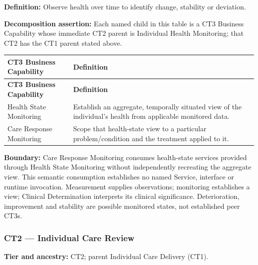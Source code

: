 \label{rad:business:336}

\textbf{Definition:} Observe health over time to identify change, stability or deviation.

\label{rad:business:338}

\textbf{Decomposition assertion:} Each named child in this table is a CT3 Business Capability whose immediate CT2 parent is Individual Health Monitoring; that CT2 has the CT1 parent stated above.

\label{rad:business:340}
\begingroup\small\setlength{\TableWidth}{\dimexpr\linewidth-4\tabcolsep-3\arrayrulewidth\relax}
\begin{longtable}{|>{\raggedright\arraybackslash}p{0.35\TableWidth}|>{\raggedright\arraybackslash}p{0.65\TableWidth}|}
\hline\rowcolor{TableHead}\textbf{CT3 Business Capability} & \textbf{Definition}\\\hline\endfirsthead
\hline\rowcolor{TableHead}\textbf{CT3 Business Capability} & \textbf{Definition}\\\hline\endhead
\hline\endfoot
Health State Monitoring & Establish an aggregate, temporally situated view of the individual’s health from applicable monitored data.\\\hline
Care Response Monitoring & Scope that health-state view to a particular problem/\allowbreak{}condition and the treatment applied to it.\\\hline
\end{longtable}\endgroup
{}\label{rad:business:345}

\textbf{Boundary:} Care Response Monitoring consumes health-state services provided through Health State Monitoring without independently recreating the aggregate view. This semantic consumption establishes no named Service, interface or runtime invocation. Measurement supplies observations; monitoring establishes a view; Clinical Determination interprets its clinical significance. Deterioration, improvement and stability are possible monitored states, not established peer CT3s.

\label{rad:business:347}
\subsubsection*{CT2 — Individual Care Review}
\label{rad:business:349}

\textbf{Tier and ancestry:} CT2; parent Individual Care Delivery (CT1).

\label{rad:business:351}

